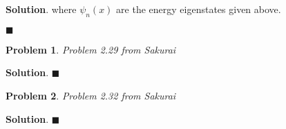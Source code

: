 \documentclass[12pt]{article}
\newtheorem{p}{Problem}
\theoremstyle{definition}
\newenvironment{s}{%
        \begin{trivlist} \item \textbf{Solution}. }{%
            \hspace*{\fill} $\blacksquare$\end{trivlist}}%
\begin{document}
{\begin{s}
where $\psi_{n}(x)$ are the energy eigenstates given above.

\end{s}

\begin{p}
Problem 2.29 from Sakurai
\end{p}

\begin{s}
\end{s}

\begin{p}
Problem 2.32 from Sakurai
\end{p}

\begin{s}
\end{s}
\end{document}
